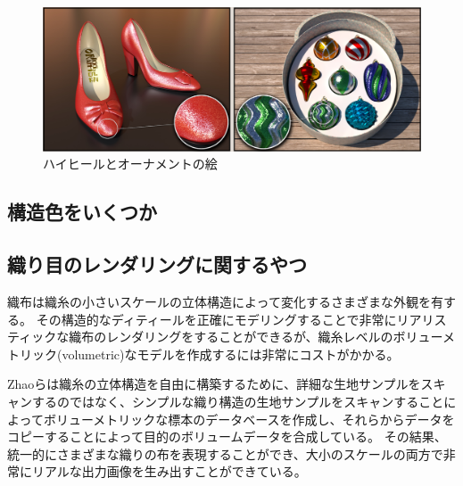 \begin{figure}[hn]
  \centering
  \includegraphics[width=5.0in]{./img/heel_ornament.jpg}
  \caption{ハイヒールとオーナメントの絵}
  \label{F}
\end{figure}


\subsection{構造色をいくつか}



\subsection{織り目のレンダリングに関するやつ}

織布は織糸の小さいスケールの立体構造によって変化するさまざまな外観を有する。
その構造的なディティールを正確にモデリングすることで非常にリアリスティックな織布のレンダリングをすることができるが、織糸レベルのボリューメトリック(volumetric)なモデルを作成するには非常にコストがかかる。

Zhaoら\cite{}は織糸の立体構造を自由に構築するために、詳細な生地サンプルをスキャンするのではなく、シンプルな織り構造の生地サンプルをスキャンすることによってボリューメトリックな標本のデータベースを作成し、それらからデータをコピーすることによって目的のボリュームデータを合成している。
その結果、統一的にさまざまな織りの布を表現することができ、大小のスケールの両方で非常にリアルな出力画像を生み出すことができている。

